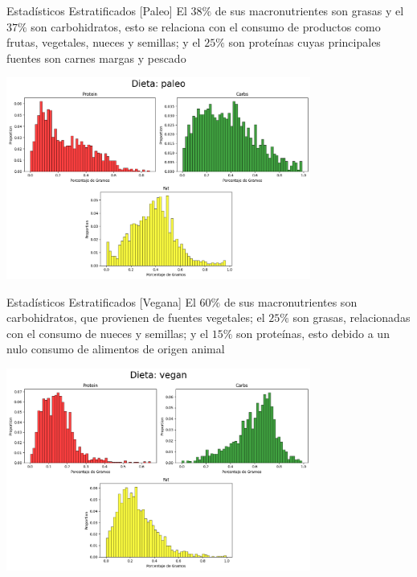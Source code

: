 \documentclass{beamer}
\begin{document}
    \begin{frame}{Estadísticos Estratificados [Paleo]}
        El $38\%$ de sus macronutrientes son grasas y el 
        $37\%$ son carbohidratos, esto se relaciona con 
        el consumo de productos como frutas, vegetales, 
        nueces y semillas; y el $25\%$ son proteínas cuyas 
        principales fuentes son carnes margas y pescado
        \begin{center}
            \includegraphics[width=0.75\textwidth]{Resources/2_03_plot_04.png}
        \end{center}
    \end{frame}

    \begin{frame}{Estadísticos Estratificados [Vegana]}
        El $60\%$ de sus macronutrientes son carbohidratos, 
        que provienen de fuentes vegetales; el $25\%$ son 
        grasas, relacionadas con el consumo de nueces y semillas; 
        y el $15\%$ son proteínas, esto debido a un nulo consumo 
        de alimentos de origen animal
        \begin{center}
            \includegraphics[width=0.75\textwidth]{Resources/2_03_plot_05.png}
        \end{center} 
    \end{frame}
\end{document}
